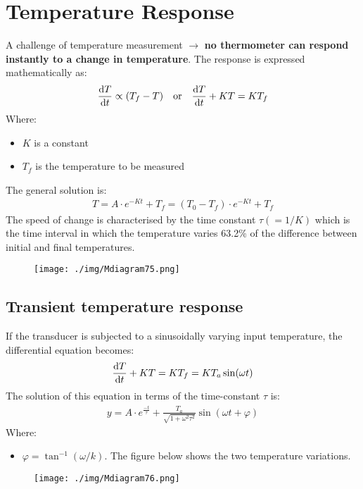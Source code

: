 \section{Temperature Response}
A challenge of temperature measurement $\longrightarrow$ \textbf{no thermometer can respond instantly to a change in temperature}. The response is expressed mathematically as:
\begin{gather}
  \frac{\dif T}{\dif t} \propto (T_f-T) \ \ \ \text{or} \ \ \ \frac{\dif T}{\dif t}+KT = KT_f
\end{gather}
Where:
\begin{itemize}
  \item $K$ is a constant
  \item $T_f$ is the temperature to be measured
\end{itemize}
The general solution is:
\begin{gather}
  T = A\cdot e^{-Kt}+T_f = (T_0-T_f)\cdot e^{-Kt} + T_f
\end{gather}
The speed of change is characterised by the time constant $\tau (=1/K)$ which is the time interval in which the temperature varies 63.2\% of the difference between initial and final temperatures.
\begin{figure}[H]
  \centering
  \texttt{[image: ./img/Mdiagram75.png]}
\end{figure}
\subsection{Transient temperature response}
If the transducer is subjected to a sinusoidally varying input temperature, the differential equation becomes:
\begin{gather}
  \frac{\dif T}{\dif t}+KT = KT_f = KT_a\sin(\omega t)
\end{gather}
The solution of this equation in terms of the time-constant $\tau$ is:
\begin{gather}
  y = A\cdot e^{\frac{-t}{\tau}}+\frac{T_a}{\sqrt{1+\omega^2\tau^2}}\sin(\omega t+\varphi)
\end{gather}
Where:
\begin{itemize}
  \item $\varphi = \tan^{-1}(\omega/k)$. The figure below shows the two temperature variations.
\end{itemize}
\begin{figure}[H]
  \centering
  \texttt{[image: ./img/Mdiagram76.png]}
\end{figure}